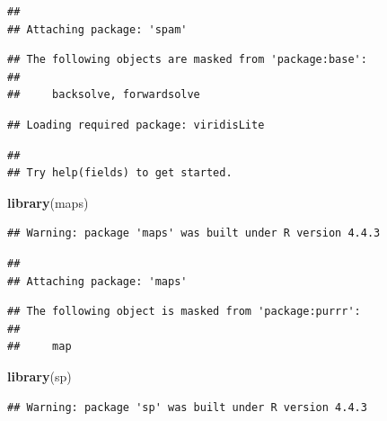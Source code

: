 \documentclass[
  11pt,
  a4paper,11pt]{article}
\newenvironment{Shaded}{\begin{snugshade}}{\end{snugshade}}
\newcommand{\AttributeTok}[1]{\textcolor[rgb]{0.13,0.29,0.53}{#1}}
\newcommand{\CommentTok}[1]{\textcolor[rgb]{0.56,0.35,0.01}{\textit{#1}}}
\newcommand{\DecValTok}[1]{\textcolor[rgb]{0.00,0.00,0.81}{#1}}
\newcommand{\FunctionTok}[1]{\textcolor[rgb]{0.13,0.29,0.53}{\textbf{#1}}}
\newcommand{\NormalTok}[1]{#1}
\newcommand{\SpecialCharTok}[1]{\textcolor[rgb]{0.81,0.36,0.00}{\textbf{#1}}}
\newcommand{\StringTok}[1]{\textcolor[rgb]{0.31,0.60,0.02}{#1}}
\begin{document}
\begin{verbatim}
## 
## Attaching package: 'spam'
\end{verbatim}

\begin{verbatim}
## The following objects are masked from 'package:base':
## 
##     backsolve, forwardsolve
\end{verbatim}

\begin{verbatim}
## Loading required package: viridisLite
\end{verbatim}

\begin{verbatim}
## 
## Try help(fields) to get started.
\end{verbatim}

\begin{Shaded}
\begin{Highlighting}[]
 \FunctionTok{library}\NormalTok{(maps)}
\end{Highlighting}
\end{Shaded}

\begin{verbatim}
## Warning: package 'maps' was built under R version 4.4.3
\end{verbatim}

\begin{verbatim}
## 
## Attaching package: 'maps'
\end{verbatim}

\begin{verbatim}
## The following object is masked from 'package:purrr':
## 
##     map
\end{verbatim}

\begin{Shaded}
\begin{Highlighting}[]
 \FunctionTok{library}\NormalTok{(sp)}
\end{Highlighting}
\end{Shaded}

\begin{verbatim}
## Warning: package 'sp' was built under R version 4.4.3
\end{verbatim}

\begin{Shaded}
\end{Shaded}
\end{document}
